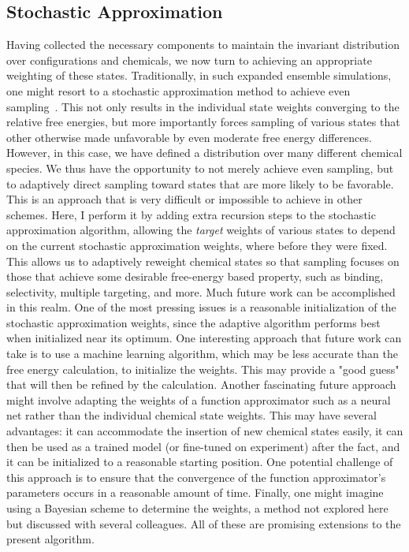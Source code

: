 \subsection{Stochastic Approximation}
%
Having collected the necessary components to maintain the invariant distribution over configurations and chemicals, we now turn to achieving an appropriate weighting of these states.
%
Traditionally, in such expanded ensemble simulations, one might resort to a stochastic approximation method to achieve even sampling~\cite{Wang2001,Tan2017,Liang2007}.
%
This not only results in the individual state weights converging to the relative free energies, but more importantly forces sampling of various states that other otherwise made unfavorable by even moderate free energy differences.
%
However, in this case, we have defined a distribution over many different chemical species.
%
We thus have the opportunity to not merely achieve even sampling, but to adaptively direct sampling toward states that are more likely to be favorable.
%
This is an approach that is very difficult or impossible to achieve in other schemes.
%
Here, I perform it by adding extra recursion steps to the stochastic approximation algorithm, allowing the \emph{target} weights of various states to depend on the current stochastic approximation weights, where before they were fixed.
%
This allows us to adaptively reweight chemical states so that sampling focuses on those that achieve some desirable free-energy based property, such as binding, selectivity, multiple targeting, and more.
%
Much future work can be accomplished in this realm.
%
One of the most pressing issues is a reasonable initialization of the stochastic approximation weights, since the adaptive algorithm performs best when initialized near its optimum.
%
One interesting approach that future work can take is to use a machine learning algorithm, which may be less accurate than the free energy calculation, to initialize the weights.
%
This may provide a "good guess" that will then be refined by the calculation.
%
Another fascinating future approach might involve adapting the weights of a function approximator such as a neural net rather than the individual chemical state weights.
%
This may have several advantages: it can accommodate the insertion of new chemical states easily, it can then be used as a trained model (or fine-tuned on experiment) after the fact, and it can be initialized to a reasonable starting position.
%
One potential challenge of this approach is to ensure that the convergence of the function approximator's parameters occurs in a reasonable amount of time.
%
Finally, one might imagine using a Bayesian scheme to determine the weights, a method not explored here but discussed with several colleagues.
%
All of these are promising extensions to the present algorithm.
%
